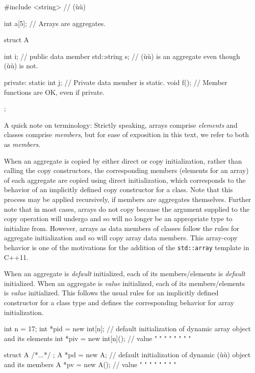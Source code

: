 \begin{emcppslisting}[emcppsbatch=e2]
#include <string>  // (ù{}ù)

int a[5];           // Arrays are aggregates.

struct A
{
    int         i;  // public data member
    std::string s;  // (ù{}ù) is an aggregate even though (ù{}ù) is not.

private:
    static int j;   // Private data member is static.
    void f();       // Member functions are OK, even if private.
};
\end{emcppslisting}
    

\noindent A quick note on terminology: Strictly speaking, arrays comprise
\emph{elements} and classes comprise \emph{members}, but for ease of
exposition in this text, we refer to both as \emph{members}.

When an aggregate is copied by either direct or copy initialization,
rather than calling the copy constructors, the corresponding members
(elements for an array) of each aggregate are copied using direct
initialization, which corresponds to the behavior of an implicitly
defined copy constructor for a class. Note that this process may be
applied recursively, if members are aggregates themselves. Further note
that in most cases, arrays do not copy because the argument supplied to
the copy operation will undergo  and so
will no longer be an appropriate type to initialize from. However,
arrays as data members of classes follow the rules for aggregate
initialization and so will copy array data members. This array-copy
behavior is one of the motivations for the addition of the
\lstinline!std::array! template in C++11.

When an aggregate is \emph{default} initialized, each of its
members/elements is \emph{default} initialized. When an aggregate is
\emph{value} initialized, each of its members/elements is \emph{value}
initialized. This follows the usual rules for an implicitly defined
constructor for a class type and defines the corresponding behavior for
array initialization.

\begin{emcppslisting}
int n = 17;
int *pid = new int[n];   // default initialization of dynamic array object and its elements
int *piv = new int[n](); // value        "         "     "      "     "     "   "     "

struct A { /*...*/ };
A *pd = new A;           // default initialization of dynamic (ù{}ù) object and its members
A *pv = new A();         // value        "         "     "     "    "     "   "     "
\end{emcppslisting}
    

